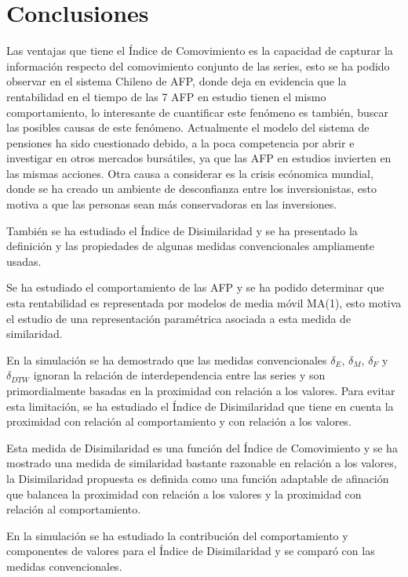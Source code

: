 \chapter{Conclusiones}
\def\baselinestretch{1.0}
\medskip
Las ventajas que tiene el \'Indice de Comovimiento es la capacidad de capturar la informaci\'on respecto del comovimiento conjunto de las series, esto se ha podido observar en el sistema Chileno de AFP, donde deja en evidencia que la rentabilidad en el tiempo de las 7 AFP en estudio tienen el mismo comportamiento, lo interesante de cuantificar este fen\'omeno es tambi\'en, buscar las posibles causas de este fen\'omeno. Actualmente el modelo del sistema de pensiones ha sido cuestionado debido, a la poca competencia por abrir e investigar en otros mercados burs\'atiles, ya que las AFP en estudios invierten en las mismas acciones. Otra causa a considerar es la crisis ec\'onomica mundial, donde se ha creado un ambiente de desconfianza entre los inversionistas, esto motiva a que las personas sean m\'as conservadoras en las inversiones.

Tambi\'en se ha estudiado el \'Indice de Disimilaridad y se ha presentado la definici\'on y las propiedades de algunas medidas convencionales ampliamente usadas.

Se ha estudiado el comportamiento de las AFP y se ha podido determinar que esta rentabilidad es representada por modelos de media m\'ovil MA(1), esto motiva el estudio de una representaci\'on param\'etrica asociada a esta medida de similaridad.

En la simulaci\'on se ha demostrado que las medidas convencionales $\delta_{E}$, $\delta_{M}$, $\delta_{F}$ y $\delta_{DTW}$ ignoran la relaci\'on de interdependencia entre las series y son primordialmente basadas en la proximidad con relaci\'on a los valores. Para evitar esta limitaci\'on, se ha estudiado el \'Indice de Disimilaridad que tiene en cuenta la proximidad con relaci\'on al comportamiento y con relaci\'on a los valores.

Esta medida de Disimilaridad es una funci\'on del \'Indice de Comovimiento y se ha mostrado una medida de similaridad bastante razonable en relaci\'on a los valores, la Disimilaridad propuesta es definida como una funci\'on adaptable de afinaci\'on que balancea la proximidad con relaci\'on a los valores y la proximidad con relaci\'on al comportamiento.

En la simulaci\'on se ha estudiado la contribuci\'on del comportamiento y componentes de valores para el \'Indice de Disimilaridad y se compar\'o con las medidas convencionales.

